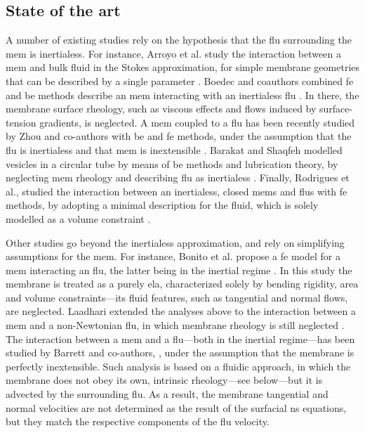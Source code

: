 \subsection{State of the art}\label{sec_state_of_the_art}

A number of existing studies rely on the hypothesis that the \acl{flu} surrounding the \acl{mem} is inertialess.
For instance, Arroyo et al. study the interaction between a \acl{mem} and bulk fluid in the Stokes approximation, for simple membrane geometries that can be described by a single parameter \cite{arroyoRelaxationDynamicsFluid2009i}.
% 
Boedec and coauthors combined  \ac{fe} and \ac{be} methods describe an \acl{mem} interacting with  an inertialess \acl{flu} \cite{boedecIsogeometricFEMBEMSimulations2017}. In there, the membrane surface rheology, such as viscous effects and  flows induced by surface-tension gradients, is neglected.
% 
A \acl{mem} coupled to a \acl{flu} has been recently studied by Zhou and co-authors  with \ac{be} and \ac{fe} methods, under the assumption that the \acl{flu} is inertialess and that \acl{mem}  is  inextensible \cite{zhouModelingSimulationOpen2026}.
% 
Barakat and Shaqfeh  modelled vesicles in a circular tube by means of  \ac{be} methods and lubrication theory, by neglecting \acl{mem} rheology and describing \acl{flu}  as inertialess \cite{barakatStokesFlowVesicles2018}.
% 
Finally, Rodrigues et al., studied the interaction between an inertialess, closed \aclp{mem} and \aclp{flu}  with \ac{fe} methods, by adopting a minimal description for the fluid, which is solely modelled as a volume constraint \cite{rodriguesSemiimplicitFiniteElement2015}.



Other studies go beyond the inertialess approximation, and rely on simplifying assumptions for the \acl{mem}.
% 
For instance, Bonito et al. propose a \ac{fe} model for a \acl{mem} interacting  an \acl{flu},  the latter being in the inertial regime  \cite{bonitoDynamicsBiomembranesEffect2011,bonitoParametricFEMGeometric2010}. In this study the membrane is treated as a purely \acl{ela}, characterized  solely by bending rigidity, area and volume constraints---its fluid features, such as tangential and normal flows, are neglected.
% 
Laadhari extended the analyses above to the interaction   between a \acl{mem} and a non-Newtonian \acl{flu}, in which membrane rheology is still neglected  \cite{laadhariFiniteElementMethodSimulation2023}.
% 
The interaction between a \acl{mem} and a \acl{flu}---both in the inertial regime---has been studied by Barrett and co-authors, \cite{barrettFiniteElementApproximation2016}, under the assumption that the membrane is perfectly inextensible. Such analysis is based on  a fluidic approach, in which the membrane does not obey its own, intrinsic rheology---see below---but it is advected by the surrounding \acl{flu}. As a result, the membrane tangential and normal velocities are not determined as the result of the surfacial \ac{ns} equations, but they match the respective components of the \acl{flu} velocity.
